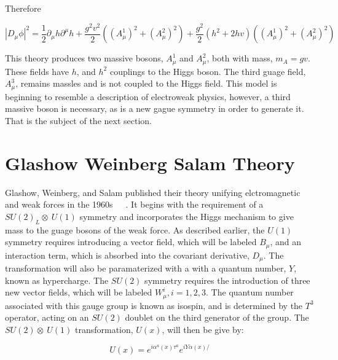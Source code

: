 \noindent Therefore

\begin{equation}\label{eq:non_abelian_higgs_mechanism_covariant_derivative_sq}
|D_{\mu}\phi|^{2} = \frac{1}{2}\partial_{\mu}h\partial^{\mu}h +
\frac{g^{2}v^{2}}{2}\left( (A_{\mu}^{1})^{2} + (A_{\mu}^{2})^{2} \right) +
\frac{g^{2}}{2}(h^{2}+2hv)\left( (A_{\mu}^{1})^{2} + (A_{\mu}^{2})^{2} \right)
\end{equation}

\par This theory produces two massive bosons, $A_{\mu}^{1}$ and
$A_{\mu}^{2}$, both with mass, $m_{A} = gv$.  These fields have $h$,
and $h^2$ couplings to the Higgs boson.  The third guage field,
$A_{\mu}^{3}$, remains massles and is not coupled to the Higgs field.
This model is beginning to resemble a description of electroweak
physics, however, a third massive boson is necessary, as is a new
gague symmetry in order to generate it.  That is the subject of the
next section.  

\section{Glashow Weinberg Salam Theory}
\label{ewk_overview}

\par Glashow, Weinberg, and Salam published their theory unifying
elctromagnetic and weak forces in the
1960s~\cite{th:Weinberg_ModelOfLeptons}~\cite{th:Glashow_PartialSymmetries}~\cite{th:Salam_EWKInteractions}.
It begins with the requirement of a $SU(2)_{L}\otimes~U(1)$
symmetry and incorporates the Higgs mechanism to give mass to the guage bosons
of the weak force.  As described earlier, the $U(1)$ symmetry requires
introducing a vector field, which will be labeled $B_{\mu}$, and an interaction term, which
is absorbed into the covariant derivative, $D_{\mu}$.  The
transformation will also be paramaterized with a with a quantum
number, $Y$, known as hypercharge.  The $SU(2)$
symmetry requires the introduction of three new 
vector fields, which will be labeled $W_{\mu}^{i}, i = 1, 2, 3$.  The
quantum number associated with this gauge group is known as isospin,
and is determined by the $T^{3}$ operator, acting on an $SU(2)$
doublet on the third generator of the group. The $SU(2)\otimes~U(1)$
transformation, $U(x)$, will then be give by:   

\begin{equation}\label{eq:ewk_su2_su1_transformation}
U(x) = e^{i\alpha^{a}(x)\tau^{a}}e^{iY\alpha(x)/}
\end{equation}

